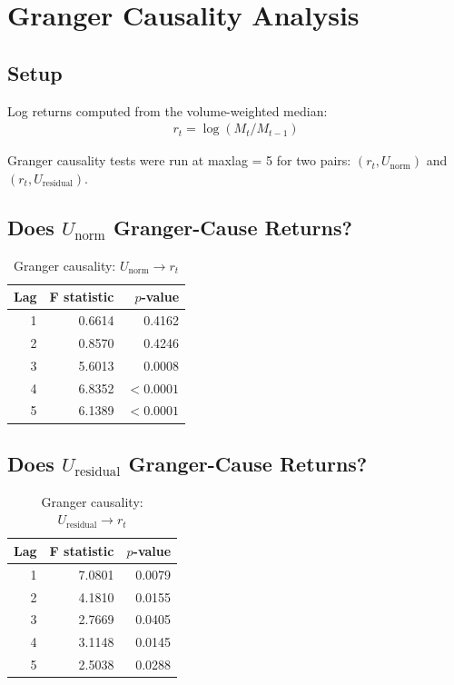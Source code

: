 \documentclass[preprint,12pt]{elsarticle}
\begin{document}
\section{Granger Causality Analysis}

\subsection{Setup}

Log returns computed from the volume-weighted median:
\begin{align}
    r_t = \log(M_t / M_{t-1})
\end{align}

Granger causality tests were run at maxlag = 5 for two pairs: $(r_t, U_\mathrm{norm})$ and $(r_t, U_\mathrm{residual})$.

\subsection{Does \texorpdfstring{$U_\mathrm{norm}$}{U\_norm} Granger-Cause Returns?}

\begin{table}[htbp]
\centering
\caption{Granger causality: $U_\mathrm{norm} \to r_t$}
\begin{tabular}{rrr}
\toprule
Lag & F statistic & $p$-value \\
\midrule
1 & 0.6614 & 0.4162 \\
2 & 0.8570 & 0.4246 \\
3 & 5.6013 & 0.0008 \\
4 & 6.8352 & $<0.0001$ \\
5 & 6.1389 & $<0.0001$ \\
\bottomrule
\end{tabular}
\end{table}

\subsection{Does \texorpdfstring{$U_\mathrm{residual}$}{U\_residual} Granger-Cause Returns?}

\begin{table}[htbp]
\centering
\caption{Granger causality: $U_\mathrm{residual} \to r_t$}
\begin{tabular}{rrr}
\toprule
Lag & F statistic & $p$-value \\
\midrule
1 & 7.0801 & 0.0079 \\
2 & 4.1810 & 0.0155 \\
3 & 2.7669 & 0.0405 \\
4 & 3.1148 & 0.0145 \\
5 & 2.5038 & 0.0288 \\
\bottomrule
\end{tabular}
\end{table}
\end{document}
